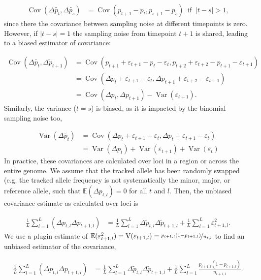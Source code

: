 \documentclass[11pt]{article}
\newcommand{\E}{\mathbb{E}}
\newcommand{\V}{\text{V}}
\DeclareMathOperator{\var}{Var}
\DeclareMathOperator{\cov}{Cov}
\begin{document}
\begin{align}
  \cov(\Delta \widetilde{p_t}, \Delta \widetilde{p_s}) &= \cov(p_{t+1} - p_{t}, p_{s+1} - p_{s}) \; \; \mathrm{if} \;\; |t-s| > 1,
\end{align}
%
since there the covariance between sampling noise at different timepoints is
zero. However, if $|t - s| = 1$ the sampling noise from timepoint $t+1$ is
shared, leading to a biased estimator of covariance:

\begin{align}
\cov(\Delta \widetilde{p_t}, \Delta \widetilde{p}_{t+1}) 
  &= \cov(p_{t+1} + \varepsilon_{t+1} - p_{t} - \varepsilon_{t}, p_{t+2} + \varepsilon_{t+2} - p_{t+1} - \varepsilon_{t+1}) \nonumber \\
  &= \cov( \Delta p_{t} + \varepsilon_{t+1} - \varepsilon_{t}, \Delta p_{t+1} + \varepsilon_{t+2} - \varepsilon_{t+1}) \nonumber \\
  &= \cov(\Delta p_{t}, \Delta p_{t+1}) - \var(\varepsilon_{t+1}).
\end{align}
%
Similarly, the variance ($t = s$) is biased, as it is impacted by the binomial
sampling noise too,
%

\begin{align} 
  \var(\Delta \widetilde{p_t}) &= \cov( \Delta p_{t} + \varepsilon_{t+1} - 
      \varepsilon_{t}, \Delta p_{t} + \varepsilon_{t+1} - \varepsilon_{t}) \nonumber \\ 
                               &= \var( \Delta p_{t} ) + \var(\varepsilon_{t+1}) +
\var(\varepsilon_{t}) \end{align}
%
In practice, these covariances are calculated over loci in a region or across the
entire genome. We assume that the tracked allele has been randomly swapped
(e.g. the tracked allele frequency is not systematically the minor, major, or
reference allele, such that $\E(\Delta p_{t,l}) = 0$ for all $t$ and $l$. Then,
the unbiased covariance estimate as calculated over loci is

\begin{align}
  \frac{1}{L} \sum_{l=1}^L \left(\Delta p_{t,l} \Delta p_{t+1,l} \right)  &=
  \frac{1}{L} \sum_{l=1}^L \Delta \widetilde{p}_{t,l} \Delta \widetilde{p}_{t+1,l}
  + \frac{1}{L} \sum_{l=1}^L \varepsilon_{t+1,l}^2.
\end{align}
%
We use a plugin estimate of $\E(\varepsilon_{t+1,l}^2) =
\V(\varepsilon_{t+1,l}) = \nicefrac{p_{t+1,l}(1-p_{t+1,l})}{n_{t,l}}$ to find
an unbiased estimator of the covariance, 

\begin{align}
  \frac{1}{L} \sum_{l=1}^L \left(\Delta p_{t,l} \Delta p_{t+1,l} \right)  &=
  \frac{1}{L} \sum_{l=1}^L \Delta \widetilde{p}_{t,l} \Delta \widetilde{p}_{t+1,l}
  + \frac{1}{L} \sum_{l=1}^L \frac{p_{t+1,l}(1-p_{t+1,l})}{n_{t+1,l}}.
\end{align}
\end{document}
